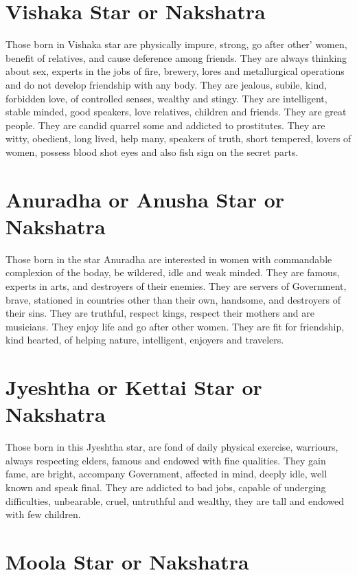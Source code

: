 \documentclass[12pt, right open]{memoir}
\begin{document}
\section{Vishaka Star or Nakshatra}

Those born in Vishaka star are physically impure, strong, go after other’ women, benefit of relatives, and cause deference among friends. They are always thinking about sex, experts in the jobs of fire, brewery, lores and metallurgical operations and do not develop friendship with any body. They are jealous, subile, kind, forbidden love, of controlled senses, wealthy and stingy. They are intelligent, stable minded, good speakers, love relatives, children and friends. They are great people. They are candid quarrel some and addicted to prostitutes. They are witty, obedient, long lived, help many, speakers of truth, short tempered, lovers of women, possess blood shot eyes and also fish sign on the secret parts.


\section{Anuradha or Anusha Star or Nakshatra}

Those born in the star Anuradha are interested in women with commandable complexion of the boday, be wildered, idle and weak minded. They are famous, experts in arts, and destroyers of their enemies. They are servers of Government, brave, stationed in countries other than their own, handsome, and destroyers of their sins. They are truthful, respect kings, respect their mothers and are musicians. They enjoy life and go after other women. They are fit for friendship, kind hearted, of helping nature, intelligent, enjoyers and travelers.


\section{Jyeshtha or Kettai Star or Nakshatra}

Those born in this Jyeshtha star, are fond of daily physical exercise, warriours, always respecting elders, famous and endowed with fine qualities. They gain fame, are bright, accompany Government, affected in mind, deeply idle, well known and speak final. They are addicted to bad jobs, capable of underging difficulties, unbearable, cruel, untruthful and wealthy, they are tall and endowed with few children.


\section{Moola Star or Nakshatra}
\end{document}
